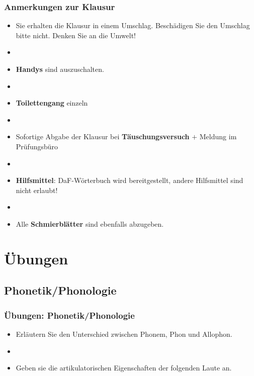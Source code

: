\begin{frame}
\frametitle{Anmerkungen zur Klausur}

\begin{itemize}
	\item Sie erhalten die Klausur in einem Umschlag. Beschädigen Sie den Umschlag bitte nicht. Denken Sie an die Umwelt!
	\item[]
	\item \textbf{Handys} sind auszuschalten. 
	\item[]
	\item \textbf{Toilettengang} einzeln
	\item[]
	\item Sofortige Abgabe der Klausur bei \textbf{Täuschungsversuch} $+$ Meldung im Prüfungsbüro
	\item[]
	\item \textbf{Hilfsmittel}: DaF-Wörterbuch wird bereitgestellt, andere Hilfsmittel sind nicht erlaubt!
	\item[]
	\item Alle \textbf{Schmierblätter} sind ebenfalls abzugeben.
	
\end{itemize}

\end{frame}

\section{Übungen}

\subsection{Phonetik/Phonologie}
\begin{frame}
\frametitle{Übungen: Phonetik/Phonologie}

\begin{itemize}
	\item Erläutern Sie den Unterschied zwischen Phonem, Phon und Allophon.
	\item[]	
	\item Geben sie die artikulatorischen Eigenschaften der folgenden Laute an.
	
	\eal
	\ex \textipa{[r]}
	\ex \textipa{[P]}
	\ex \textipa{[b]}
	\ex \textipa{[x]}
	\zl

\end{itemize}

\end{frame}


